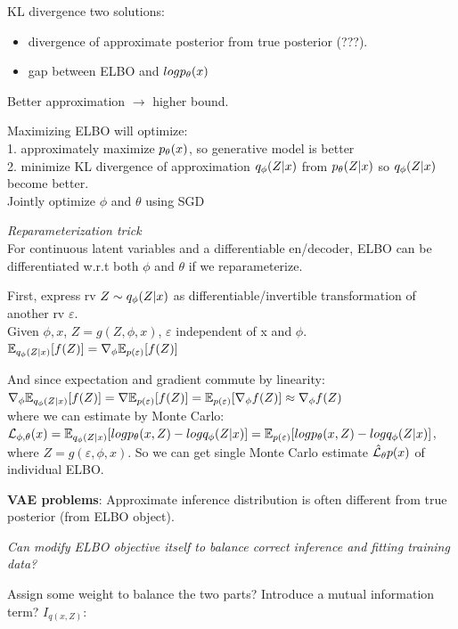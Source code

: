 \documentclass[12pt,a4paper]{article}
\begin{document}
KL divergence two solutions:
\begin{itemize}
\item divergence of approximate posterior from true posterior (???).
\item gap between ELBO and $logp_\theta(x)$
\end{itemize}
Better approximation $\rightarrow$ higher bound.

\vspace{0.5cm}
Maximizing ELBO will optimize:\\
1. approximately maximize $p_\theta(x)$, so generative model is better \\
2. minimize KL divergence of approximation $q_\phi(Z|x)$ from $p_\theta(Z|x)$ so $q_\phi(Z|x)$ become better. \\
Jointly optimize $\phi$ and $\theta$ using SGD

\textit{Reparameterization trick}\\
For continuous latent variables and a differentiable en/decoder, ELBO can be differentiated w.r.t both $\phi$ and $\theta$ if we reparameterize. 

First, express rv $Z\sim q_\phi(Z|x)$ as differentiable/invertible transformation of another rv $\varepsilon$.\\
Given $\phi, x$, $Z=g(Z, \phi, x)$, $\varepsilon$ independent of x and $\phi$. \\
$\mathbb{E}_{q_\phi(Z|x)}[f(Z)]=\nabla_\phi\mathbb{E}_{p(\varepsilon)}[f(Z)]$

And since expectation and gradient commute by linearity:\\
$\nabla_\phi\mathbb{E}_{q_\phi(Z|x)}[f(Z)]=\nabla \mathbb{E}_{p(\varepsilon)}[f(Z)]=\mathbb{E}_{p(\varepsilon)}[\nabla_\phi f(Z)] \approx \nabla_\phi f(Z)$\\
where we can estimate by Monte Carlo:\\
$\mathcal{L}_{\phi,\theta}(x)=\mathbb{E}_{q_\phi(Z|x)}[log p_\theta(x,Z)-log q_\phi(Z|x)]=\mathbb{E}_{p(\varepsilon)}[log p_\theta(x,Z)-log q_\phi(Z|x)]$, where $Z=g(\varepsilon,\phi,x)$. 
So we can get single Monte Carlo estimate $\hat{\mathcal{L}}_\theta p(x)$ of individual ELBO. 

\vspace{0.5cm}
\textbf{VAE problems}: 
Approximate inference distribution is often different from true posterior (from ELBO object). 

\textit{Can modify ELBO objective itself to balance correct inference and fitting training data? }

Assign some weight to balance the two parts? 
Introduce a mutual information term?  $I_{q(x,Z)}$:\\
\end{document}
